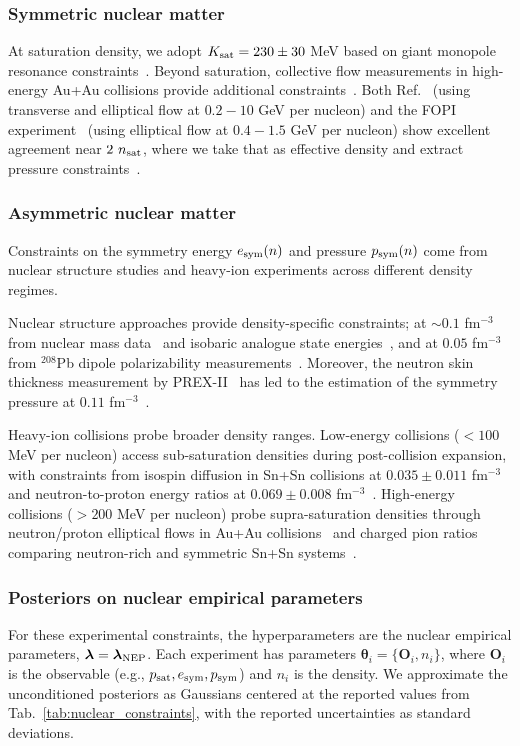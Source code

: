 \documentclass[prd,twocolumn,a4paper,floatfix,nofootinbib,preprintnumbers,superscriptaddress]{revtex4-1}
\begin{document}
\subsubsection{Symmetric nuclear matter}
At saturation density, we adopt $K_{\rm sat} = 230 \pm 30$ MeV based on giant monopole resonance constraints~\cite{Dutra:2012mb}. Beyond saturation, collective flow measurements in high-energy Au+Au collisions provide additional constraints~\cite{Danielewicz:2002pu, LeFevre:2015paj}. Both Ref.~\cite{Danielewicz:2002pu} (using transverse and elliptical flow at $0.2-10$ GeV per nucleon) and the FOPI experiment~\cite{LeFevre:2015paj} (using elliptical flow at $0.4-1.5$ GeV per nucleon) show excellent agreement near $2 \ n_{\rm sat}$, where we take that as effective density and extract pressure constraints~\cite{Tsang:2023vhh}.

\subsubsection{Asymmetric nuclear matter}
Constraints on the symmetry energy $e_{\rm sym}(n)$ and pressure $p_{\rm sym}(n)$ come from nuclear structure studies and heavy-ion experiments across different density regimes.

Nuclear structure approaches provide density-specific constraints; at $\sim 0.1$ fm$^{-3}$ from nuclear mass data~\cite{Brown:2013mga, Kortelainen:2011ft} and isobaric analogue state energies~\cite{Danielewicz:2016bgb}, and at $0.05$ fm$^{-3}$ from $^{208}$Pb dipole polarizability measurements~\cite{Zhang:2015ava}. Moreover, the neutron skin thickness measurement by PREX-II~\cite{PREX:2021umo,Reed:2021nqk} has led to the estimation of the symmetry pressure at $0.11$ fm$^{-3}$~\cite{Lynch:2021xkq}.

Heavy-ion collisions probe broader density ranges. Low-energy collisions ($<100$ MeV per nucleon) access sub-saturation densities during post-collision expansion, with constraints from isospin diffusion in Sn+Sn collisions at $0.035\pm0.011$ fm$^{-3}$~\cite{Tsang:2008fd} and neutron-to-proton energy ratios at $0.069\pm0.008$ fm$^{-3}$~\cite{Morfouace:2019jky}. High-energy collisions ($>200$ MeV per nucleon) probe supra-saturation densities through neutron/proton elliptical flows in Au+Au collisions~\cite{Russotto:2011hq,Russotto:2016ucm,Cozma:2017bre} and charged pion ratios comparing neutron-rich and symmetric Sn+Sn systems~\cite{SpiRIT:2021gtq}.

\subsubsection{Posteriors on nuclear empirical parameters}
For these experimental constraints, the hyperparameters are the nuclear empirical parameters, $\boldsymbol{\lambda} = \boldsymbol{\lambda}_{\rm NEP}$. Each experiment has parameters $\boldsymbol{\theta}_i = \{\boldsymbol{O}_i, n_i\}$, where $\boldsymbol{O}_i$ is the observable (e.g., $p_{\rm sat}, e_{\rm sym}, p_{\rm sym}$) and $n_i$ is the density. We approximate the unconditioned posteriors as Gaussians centered at the reported values from Tab.~\ref{tab:nuclear_constraints}, with the reported uncertainties as standard deviations.
\end{document}
